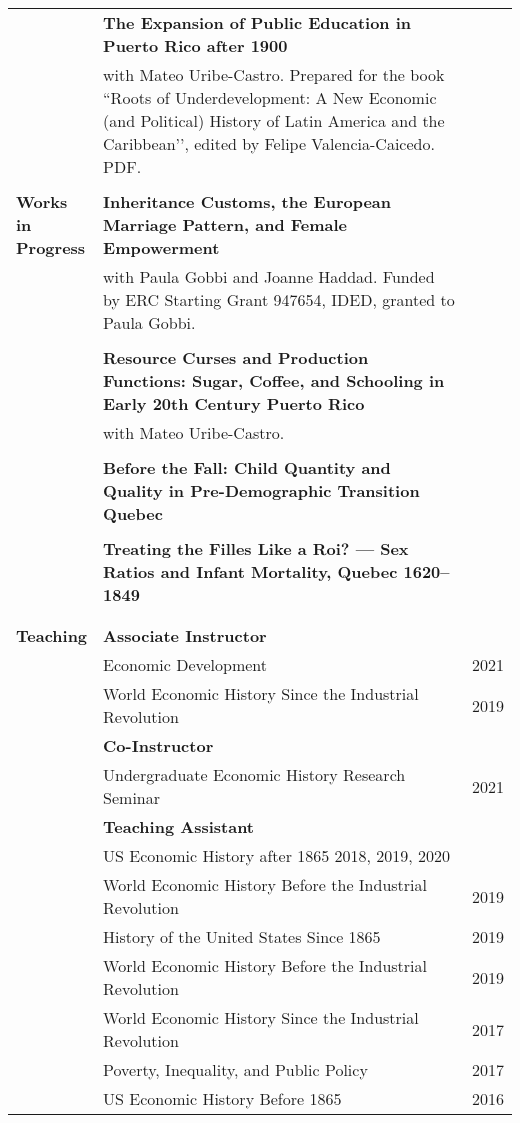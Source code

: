 \documentclass[letterpaper,11pt,oneside]{article}
\begin{document}
\begin{longtable}{@{} p{0.15\linewidth} p{0.8\linewidth} p{0.05\linewidth}}
      & \textbf{The Expansion of Public Education in Puerto Rico after 1900} &\\

      & with Mateo Uribe-Castro. Prepared for the book ``Roots of Underdevelopment: A New Economic (and Political) History of Latin America and the Caribbean’’, edited by Felipe Valencia-Caicedo. PDF. & \\
  \\


     
     \textbf{\large{Works in \(\phantom{11}\) Progress}}           & \textbf{Inheritance Customs, the European Marriage Pattern, and Female Empowerment}\\ 
     &  with Paula Gobbi and Joanne Haddad. Funded by ERC Starting Grant 947654, IDED, granted to Paula Gobbi. &  \\
       \\
       &  \textbf{Resource Curses and Production Functions: Sugar, Coffee, and Schooling in Early 20th Century Puerto Rico} \\ 
      &  with  Mateo Uribe-Castro. \\
      \\
      &  \textbf{Before the Fall: Child Quantity and Quality in
      Pre-Demographic Transition Quebec} \\ 
      &   \\
      &  \textbf{Treating the Filles Like a Roi? --- Sex Ratios and Infant Mortality, Quebec 1620--1849} \\ 
      &   \\
      \\


     \textbf{\large{Teaching}} &  \textbf{Associate Instructor} & \\
      & Economic Development & \hfill 2021\\
     &  World Economic History Since the Industrial Revolution &\hfill 2019\\
     &   \textbf{Co-Instructor} \\
     & Undergraduate Economic History Research Seminar & \hfill  2021 \\
     & \textbf{Teaching Assistant} &\\

     &  \multicolumn{2}{l}{ US Economic History after 1865 \hfill 2018, 2019, 2020 }\\
     &  World Economic History Before the Industrial Revolution & \hfill 2019\\
     &  History of the United States Since 1865 & \hfill 2019\\
     &  World Economic History Before the Industrial Revolution & \hfill 2019\\
     &  World Economic History Since the Industrial Revolution & \hfill 2017\\
     &  Poverty, Inequality, and Public Policy & \hfill 2017\\
     &  US Economic History Before 1865 & \hfill 2016 \\


\end{longtable}
\end{document}
